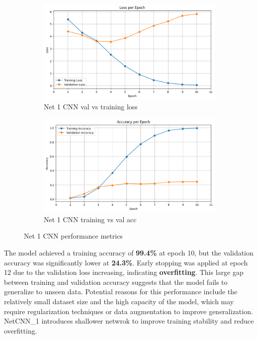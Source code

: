 \documentclass[12pt]{article}
\begin{document}
\begin{figure}[ht]
    \centering
    \begin{subfigure}{0.45\linewidth}
        \centering
        \includegraphics[width=\linewidth]{net_1_loss.png}
        \caption{Net 1 CNN val vs training loss}
        \label{fig:net0_loss}
    \end{subfigure}
    \hfill
    \begin{subfigure}{0.45\linewidth}
        \centering
        \includegraphics[width=\linewidth]{net1_acc.png}
        \caption{Net 1 CNN training vs val acc}
        \label{fig:net0_acc}
    \end{subfigure}
    \caption{Net 1 CNN performance metrics}
    \label{fig:net0_performance}
\end{figure}

The model achieved a training accuracy of \textbf{99.4\%} at epoch 10, but the validation accuracy was significantly lower at \textbf{24.3\%}. Early stopping was applied at epoch 12 due to the validation loss increasing, indicating \textbf{overfitting}. This large gap between training and validation accuracy suggests that the model fails to generalize to unseen data. Potential reasons for this performance include the relatively small dataset size and the high capacity of the model, which may require regularization techniques or data augmentation to improve generalization. NetCNN\_1 introduces shallower netwrok to improve training stability and reduce overfitting.
\end{document}
